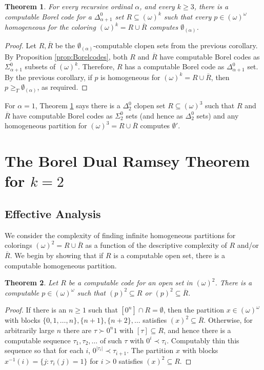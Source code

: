 \documentclass{amsart}
\newtheorem{thm}{Theorem}[section]
\theoremstyle{definition}
\theoremstyle{remark}
\newcommand{\block}[2]{{#1}^{-1}(#2)}
\begin{document}
\begin{thm}\label{thm:hyp}
For every recursive ordinal $\alpha$, and every $k\geq 3$, there is a computable 
Borel code for a $\Delta^0_{\alpha+1}$ set $R\subseteq (\omega)^k$ such that 
every $p \in (\omega)^\omega$
homogeneous for the coloring $(\omega)^k = R \cup \overline{R}$ computes $\emptyset_{(\alpha)}$.
\end{thm}

\begin{proof}
Let $R, \overline{R}$ 
be the $\emptyset_{(\alpha)}$-computable 
clopen sets from the previous corollary.  By Proposition \ref{prop:Borelcodes},
both $R$ and $\overline{R}$ have computable Borel codes as $\Sigma^0_{\alpha+1}$ 
subsets of $(\omega)^k$.  Therefore, $R$ has a computable Borel code
as $\Delta^0_{\alpha+1}$ set.  By the previous corollary, if $p$ is 
homogeneous for $(\omega)^k = R \cup \overline{R}$, then $p \geq_T \emptyset_{(\alpha)}$, as required.
\end{proof}

For $\alpha = 1$, Theorem \ref{thm:hyp} says there is a $\Delta^0_2$ clopen set $R \subseteq (\omega)^3$ such that $R$ and $\overline{R}$ have computable Borel 
codes as $\Sigma^0_2$ sets (and hence as $\Delta^0_2$ sets) and any homogeneous partition for $(\omega)^3 = R \cup \overline{R}$ computes $\emptyset'$. 

\section{The Borel Dual Ramsey Theorem for $k=2$}
\label{sec:4} 

\subsection{Effective Analysis} 
We consider the complexity of finding infinite homogeneous partitions for colorings $(\omega)^2 = R \cup \overline{R}$ as a function of the descriptive complexity of
$R$ and/or $\overline{R}$. 
We begin by showing that if $R$ is a computable open set, there is a computable homogeneous partition.

\begin{thm}
\label{thm:sigma1}
Let $R$ be a computable code for an open set in $(\omega)^2$.  
There is a computable $p \in (\omega)^{\omega}$ such that $(p)^2 \subseteq R$ or 
$(p)^2 \subseteq \overline{R}$.
\end{thm}

\begin{proof}
If there is an $n \geq 1$ such that $[0^n] \cap R = \emptyset$, then the partition $x \in (\omega)^{\omega}$ with blocks 
$\{0,1,\dots, n\}, \{n+1\}, \{n+2\}, \dots$ satisfies $(x)^2 \subseteq \overline{R}$.  Otherwise, for arbitrarily large $n$ 
there are $\tau \succ 0^n1$ with $[\tau]\subseteq R$, and hence  
there is a computable sequence $\tau_1,\tau_2,\dots$ of such $\tau$ with $0^i\prec \tau_i$.  Computably thin this sequence 
so that for each $i$, $0^{|\tau_i|} \prec \tau_{i+1}$.  The 
partition $x$ with blocks $\block{x}{i} = \{j : \tau_i(j) = 1\}$ for $i > 0$ satisfies $(x)^2 \subseteq R$. 
\end{proof}
\end{document}
